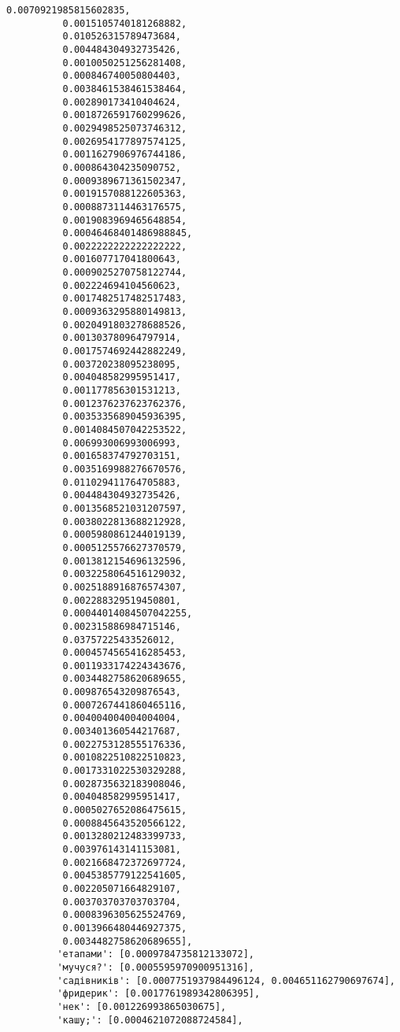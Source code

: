 \documentclass[11pt]{article}
\begin{document}
\begin{Verbatim}[commandchars=\\\{\}]
          0.0070921985815602835,
          0.0015105740181268882,
          0.010526315789473684,
          0.004484304932735426,
          0.0010050251256281408,
          0.000846740050804403,
          0.0038461538461538464,
          0.002890173410404624,
          0.0018726591760299626,
          0.0029498525073746312,
          0.0026954177897574125,
          0.0011627906976744186,
          0.000864304235090752,
          0.0009389671361502347,
          0.0019157088122605363,
          0.0008873114463176575,
          0.0019083969465648854,
          0.00046468401486988845,
          0.0022222222222222222,
          0.001607717041800643,
          0.0009025270758122744,
          0.002224694104560623,
          0.0017482517482517483,
          0.0009363295880149813,
          0.0020491803278688526,
          0.001303780964797914,
          0.0017574692442882249,
          0.003720238095238095,
          0.004048582995951417,
          0.001177856301531213,
          0.0012376237623762376,
          0.0035335689045936395,
          0.0014084507042253522,
          0.006993006993006993,
          0.001658374792703151,
          0.0035169988276670576,
          0.011029411764705883,
          0.004484304932735426,
          0.0013568521031207597,
          0.0038022813688212928,
          0.0005980861244019139,
          0.0005125576627370579,
          0.0013812154696132596,
          0.0032258064516129032,
          0.0025188916876574307,
          0.002288329519450801,
          0.00044014084507042255,
          0.002315886984715146,
          0.03757225433526012,
          0.0004574565416285453,
          0.0011933174224343676,
          0.0034482758620689655,
          0.009876543209876543,
          0.0007267441860465116,
          0.004004004004004004,
          0.003401360544217687,
          0.0022753128555176336,
          0.0010822510822510823,
          0.0017331022530329288,
          0.0028735632183908046,
          0.004048582995951417,
          0.0005027652086475615,
          0.0008845643520566122,
          0.0013280212483399733,
          0.003976143141153081,
          0.0021668472372697724,
          0.0045385779122541605,
          0.002205071664829107,
          0.003703703703703704,
          0.0008396305625524769,
          0.0013966480446927375,
          0.0034482758620689655],
         'етапами': [0.0009784735812133072],
         'мучуся?': [0.0005595970900951316],
         'садівників': [0.0007751937984496124, 0.004651162790697674],
         'фридерик': [0.0017761989342806395],
         'нек': [0.001226993865030675],
         'кашу;': [0.0004621072088724584],

\end{Verbatim}
\end{document}
